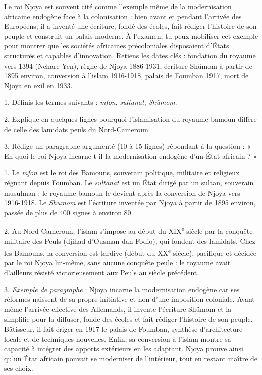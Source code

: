 \documentclass[11pt]{article}
\newcommand{\cle}[1]{{\popxbold\color{popdark}#1}}
\begin{document}
\begin{aretenir}
Le roi \cle{Njoya} est souvent cité comme l'exemple même de la \cle{modernisation africaine endogène} face à la colonisation : bien avant et pendant l'arrivée des Européens, il a inventé une écriture, fondé des écoles, fait rédiger l'histoire de son peuple et construit un palais moderne. À l'examen, tu peux mobiliser cet exemple pour montrer que les sociétés africaines précoloniales disposaient d'États structurés et capables d'innovation. Retiens les dates clés : fondation du royaume vers 1394 (Nchare Yen), règne de Njoya 1886-1931, écriture Shümom à partir de 1895 environ, conversion à l'islam 1916-1918, palais de Foumban 1917, mort de Njoya en exil en 1933.
\end{aretenir}

\begin{exercice}
1. Définis les termes suivants : \emph{mfon}, \emph{sultanat}, \emph{Shümom}.\par
2. Explique en quelques lignes pourquoi l'islamisation du royaume bamoun diffère de celle des lamidats peuls du Nord-Cameroun.\par
3. Rédige un paragraphe argumenté (10 à 15 lignes) répondant à la question : « En quoi le roi Njoya incarne-t-il la modernisation endogène d'un État africain ? »
\end{exercice}

\begin{corrige}
1. Le \emph{mfon} est le roi des Bamouns, souverain politique, militaire et religieux régnant depuis Foumban. Le \emph{sultanat} est un État dirigé par un sultan, souverain musulman : le royaume bamoun le devient après la conversion de Njoya vers 1916-1918. Le \emph{Shümom} est l'écriture inventée par Njoya à partir de 1895 environ, passée de plus de 400 signes à environ 80.\par
2. Au Nord-Cameroun, l'islam s'impose au début du XIX\textsuperscript{e} siècle par la conquête militaire des Peuls (djihad d'Ousman dan Fodio), qui fondent des lamidats. Chez les Bamouns, la conversion est tardive (début du XX\textsuperscript{e} siècle), pacifique et décidée par le roi Njoya lui-même, sans aucune conquête peule : le royaume avait d'ailleurs résisté victorieusement aux Peuls au siècle précédent.\par
3. \emph{Exemple de paragraphe} : Njoya incarne la modernisation endogène car ses réformes naissent de sa propre initiative et non d'une imposition coloniale. Avant même l'arrivée effective des Allemands, il invente l'écriture Shümom et la simplifie pour la diffuser, fonde des écoles et fait rédiger l'histoire de son peuple. Bâtisseur, il fait ériger en 1917 le palais de Foumban, synthèse d'architecture locale et de techniques nouvelles. Enfin, sa conversion à l'islam montre sa capacité à intégrer des apports extérieurs en les adaptant. Njoya prouve ainsi qu'un État africain pouvait se moderniser de l'intérieur, tout en restant maître de ses choix.
\end{corrige}
\end{document}
